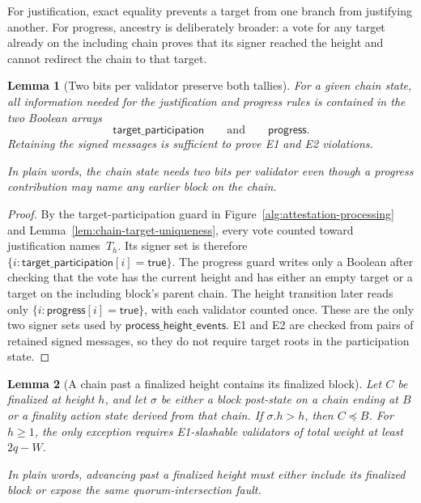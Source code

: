 \ifx\litemode\undefined\documentclass{article}\fi
\theoremstyle{plain}
\newtheorem{lemma}{Lemma}
\theoremstyle{definition}
\theoremstyle{remark}
\newcommand{\targetParticipation}{\mathsf{target\_participation}}
\newcommand{\progressBit}{\mathsf{progress}}
\begin{document}
For justification, exact equality prevents a target from one branch from
justifying another.  For progress, ancestry is deliberately broader: a vote
for any target already on the including chain proves that its signer reached
the height and cannot redirect the chain to that target.

\begin{lemma}[Two bits per validator preserve both tallies]\label{lem:target-bit-compression}
For a given chain state, all information needed for the justification and
progress rules is contained in the two Boolean arrays
\[
  \targetParticipation
  \qquad\text{and}\qquad
  \progressBit.
\]
Retaining the signed messages is sufficient to prove E1 and E2 violations.

In plain words, the chain state needs two bits per validator even though a
progress contribution may name any earlier block on the chain.
\end{lemma}

\begin{proof}
By the target-participation guard in
Figure~\ref{alg:attestation-processing} and
Lemma~\ref{lem:chain-target-uniqueness}, every vote counted toward
justification names~\(T_h\).  Its signer set is therefore
\(\{i:\targetParticipation[i]=\mathsf{true}\}\).
The progress guard writes only a Boolean after checking that the vote has the
current height and has either an empty target or a target on the including
block's parent chain.  The height transition later reads only
\(\{i:\progressBit[i]=\mathsf{true}\}\), with each validator counted once.  These
are the only two signer sets used by
\(\mathsf{process\_height\_events}\).
E1 and E2 are checked
from pairs of retained signed messages, so they do not require target roots
in the participation state.
\end{proof}

\begin{lemma}[A chain past a finalized height contains its finalized block]\label{lem:past-finalized}
Let \(C\) be finalized at height \(h\), and let \(\sigma\) be either a block
post-state on a chain ending at \(B\) or a finality action state derived from
that chain.  If \(\sigma.h>h\), then \(C\preceq B\).  For \(h\geq1\), the
only exception requires E1-slashable validators of total weight at least
\(2q-W\).

In plain words, advancing past a finalized height must either include its
finalized block or expose the same quorum-intersection fault.
\end{lemma}
\end{document}

